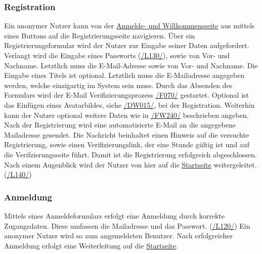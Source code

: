 \subsubsection{Registration}\label{an:reg}
\begin{description}
     Ein anonymer Nutzer kann von der \hyperref[an:log]{Anmelde- und Willkommensseite} aus mittels eines
    Buttons auf die Registrierungsseite navigieren.
     Über ein Registrierungsformular wird der Nutzer zur Eingabe seiner
    Daten aufgefordert. Verlangt wird die Eingabe eines Passworts (\hyperref[leist:130]{/L130/}),
    sowie von Vor- und Nachname. Letztlich muss die E-Mail-Adresse
    sowie von Vor- und Nachname. Die Eingabe eines Titels ist optional. Letztlich muss die E-Mailadresse
    angegeben werden, welche einzigartig im System sein muss. Durch das Absenden des Formulars wird der E-Mail Verifizierungsprozess
    \hyperref[funkt:070]{/F070/} gestartet.
     Optional ist das Einfügen eines Avatarbildes, siehe \hyperref[d015]{/DW015/},
    bei der Registration.
     Weiterhin kann der Nutzer optional weitere Daten wie in \hyperref[funkt:240]{/FW240/} beschrieben angeben.
     Nach der Registrierung wird eine automatisierte E-Mail
    an die angegebene Mailadresse gesendet. Die Nachricht beinhaltet einen Hinweis auf
    die versuchte Registrierung, sowie einen Verifizierungslink, der eine Stunde gültig ist und auf die Verifzierungsseite führt.
    Damit ist die Registrierung erfolgreich abgeschlossen. Nach einem Augenblick wird der Nutzer von hier
    auf die \hyperref[nut:start]{Startseite} weitergeleitet. (\hyperref[leist:140]{/L140/})
\end{description}

\subsubsection{Anmeldung}\label{an:log}
\begin{description}
     Mittels eines Anmeldeformulars erfolgt eine Anmeldung durch korrekte Zugangsdaten.
    Diese umfassen die Mailadresse und das Passwort. (\hyperref[leist:120]{/L120/})
    Ein anonymer Nutzer wird so zum angemeldeten Benutzer.
     Nach erfolgreicher Anmeldung erfolgt eine Weiterleitung
    auf die \hyperref[nut:start]{Startseite}.
\end{description}

